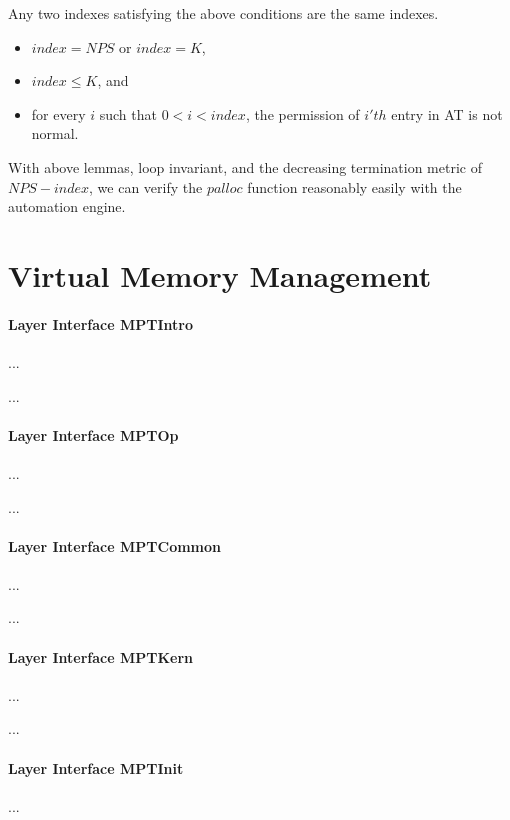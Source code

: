 \begin{lemma} [Unique] Any two indexes satisfying the above conditions are the same indexes.
\end{lemma}

\begin{definition} 
\begin{itemize}
\item $index=NPS$ or $index=K$,
\item $index\le K$, and
\item for every $i$ such that $0<i<index$, the permission of $i'th$ entry in AT is not normal.
\end{itemize}
\end{definition}

With above lemmas, loop invariant, and the decreasing termination metric of $NPS-index$, we can verify
the $palloc$ function reasonably easily with the automation engine.


\section{Virtual Memory Management}

\paragraph{Layer Interface MPTIntro}
...

...

\paragraph{Layer Interface MPTOp}
...

...

\paragraph{Layer Interface MPTCommon}
...

...

\paragraph{Layer Interface MPTKern}
...

...

\paragraph{Layer Interface MPTInit}
...

